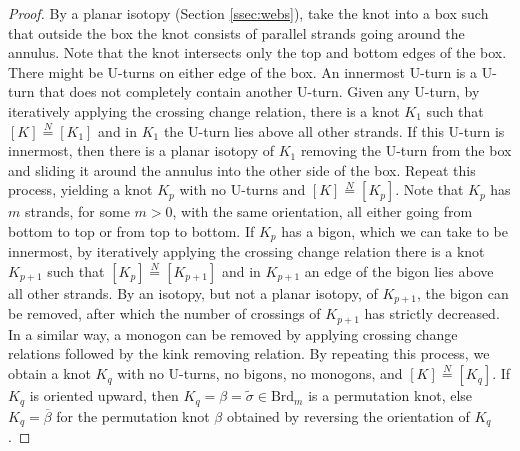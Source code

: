 \documentclass[12pt,
	]{amsart}
\theoremstyle{definition}
\renewcommand{\bar}{\overline}
\renewcommand{\tilde}{\widetilde}
\newcommand{\mrm}[1]{\mathrm{#1}}
\newcommand{\class}[1]{\left[#1\right]}
\newcommand{\rev}[1]{\bar{#1}}
\newcommand{\lift}[1]{\tilde{#1}}
\newcommand{\braid}{\mrm{Brd}}
\newcommand{\indeq}{\overset{N}{=}}
\begin{document}
\begin{proof}
By a planar isotopy (Section \ref{ssec:webs}), take the knot into a box such that outside the box the knot consists of parallel strands going around the annulus.  Note that the knot intersects only the top and bottom edges of the box.  There might be U-turns on either edge of the box.  An innermost U-turn is a U-turn that does not completely contain another U-turn.  Given any U-turn, by iteratively applying the crossing change relation, there is a knot $K_1$ such that $\class{K}\indeq\class{K_1}$ and in $K_1$ the U-turn lies above all other strands.  If this U-turn is innermost, then there is a planar isotopy of $K_1$ removing the U-turn from the box and sliding it around the annulus into the other side of the box.  Repeat this process, yielding a knot $K_p$ with no U-turns and $\class{K}\indeq\class{K_p}$.  Note that $K_p$ has $m$ strands, for some $m>0$, with the same orientation, all either going from bottom to top or from top to bottom.  If $K_p$ has a bigon, which we can take to be innermost, by iteratively applying the crossing change relation there is a knot $K_{p+1}$ such that $\class{K_p}\indeq\class{K_{p+1}}$ and in $K_{p+1}$ an edge of the bigon lies above all other strands.  By an isotopy, but not a planar isotopy, of $K_{p+1}$, the bigon can be removed, after which the number of crossings of $K_{p+1}$ has strictly decreased.  In a similar way, a monogon can be removed by applying crossing change relations followed by the kink removing relation.  By repeating this process, we obtain a knot $K_{q}$ with no U-turns, no bigons, no monogons, and $\class{K}\indeq\class{K_{q}}$.  If $K_q$ is oriented upward, then $K_q=\beta=\lift{\sigma}\in\braid_m$ is a permutation knot, else $K_q=\rev{\beta}$ for the permutation knot $\beta$ obtained by reversing the orientation of $K_q$.  
\end{proof}
\end{document}
